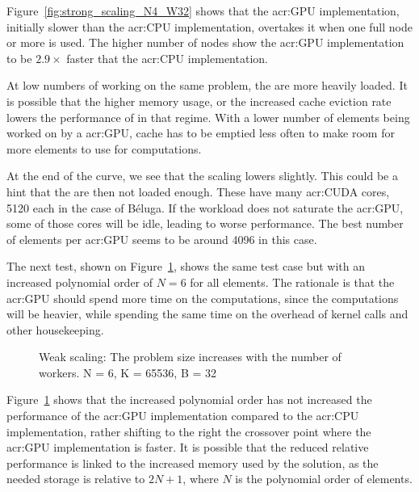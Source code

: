 Figure~\ref{fig:strong_scaling_N4_W32} shows that the \acrshort{acr:GPU} implementation, initially
slower than the \acrshort{acr:CPU} implementation, overtakes it when one full node or more is used.
The higher number of nodes show the \acrshort{acr:GPU} implementation to be \(2.9 \times \) faster
that the \acrshort{acr:CPU} implementation.

At low numbers of  working on the same problem, the  are
more heavily loaded. It is possible that the higher memory usage, or the increased cache eviction
rate lowers the performance of  in that regime. With a lower number of elements
being worked on by a \acrshort{acr:GPU}, cache has to be emptied less often to make room for more
elements to use for computations.

At the end of the curve, we see that the scaling lowers slightly. This could be a hint that the
 are then not loaded enough. These  have many
\acrshort{acr:CUDA} cores, 5120 each in the case of Béluga. If the workload does not saturate
the \acrshort{acr:GPU}, some of those cores will be idle, leading to worse performance. The best
number of elements per \acrshort{acr:GPU} seems to be around 4096 in this case.

The next test, shown on Figure~\ref{fig:strong_scaling_N6_W32}, shows the same test case but with an
increased polynomial order of \(N = 6\) for all elements. The rationale is that the
\acrshort{acr:GPU} should spend more time on the computations, since the computations will be
heavier, while spending the same time on the overhead of kernel calls and other housekeeping.

\begin{figure}[H]
	\centering
	
	\caption{Weak scaling: The problem size increases with the number of workers. N = 6, K = 65536, B = 32}\label{fig:strong_scaling_N6_W32}
\end{figure}

Figure~\ref{fig:strong_scaling_N6_W32} shows that the increased polynomial order has not increased
the performance of the \acrshort{acr:GPU} implementation compared to the \acrshort{acr:CPU}
implementation, rather shifting to the right the crossover point where the \acrshort{acr:GPU}
implementation is faster. It is possible that the reduced relative performance is linked to the
increased memory used by the solution, as the needed storage is relative to \(2 N + 1\), where \(N\)
is the polynomial order of elements.

